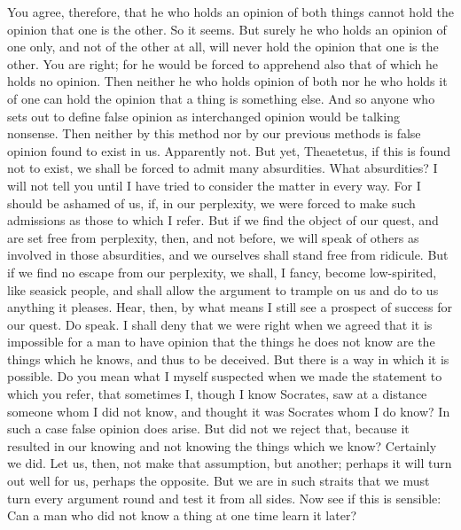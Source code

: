 \documentclass[letterpaper,12pt]{article}
\newcommand{\stephpag}[1]{\marginnote{\small\itshape\fontfamily{ppl}\selectfont #1}}
\begin{document}
\begin{drama}
\socratesspeaks
You agree, therefore, that he who holds an opinion of both things cannot hold the opinion that one is the other.
\theaetetusspeaks
So it seems.
\socratesspeaks
But surely he who holds an opinion of one only, and not of the other at all, will never hold the opinion that one is the other.
\theaetetusspeaks
You are right; for he would be forced to apprehend also that of which he holds no opinion.
\socratesspeaks
Then neither he who holds opinion of both nor he who holds it of one can hold the opinion that a thing is something else. \stephpag{e} And so anyone who sets out to define false opinion as interchanged opinion would be talking nonsense. Then neither by this method nor by our previous methods is false opinion found to exist in us.
\theaetetusspeaks
Apparently not.
\socratesspeaks
But yet, Theaetetus, if this is found not to exist, we shall be forced to admit many absurdities.
\theaetetusspeaks
What absurdities?
\socratesspeaks
I will not tell you until I have tried to consider the matter in every way. For I should be ashamed of us, if, in our perplexity, we were forced to make such admissions as those to which I refer. But if we find the object of our quest, \stephpag{191 a} and are set free from perplexity, then, and not before, we will speak of others as involved in those absurdities, and we ourselves shall stand free from ridicule. But if we find no escape from our perplexity, we shall, I fancy, become low-spirited, like seasick people, and shall allow the argument to trample on us and do to us anything it pleases. Hear, then, by what means I still see a prospect of success for our quest.
\theaetetusspeaks
Do speak.
\socratesspeaks
I shall deny that we were right when we agreed that it is impossible for a man to have opinion that the things he does not know are the things which he knows, \stephpag{b} and thus to be deceived. But there is a way in which it is possible.
\theaetetusspeaks
Do you mean what I myself suspected when we made the statement to which you refer, that sometimes I, though I know Socrates, saw at a distance someone whom I did not know, and thought it was Socrates whom I do know? In such a case false opinion does arise.
\socratesspeaks
But did not we reject that, because it resulted in our knowing and not knowing the things which we know?
\theaetetusspeaks
Certainly we did.
\socratesspeaks
Let us, then, not make that assumption, but another; perhaps \stephpag{c} it will turn out well for us, perhaps the opposite. But we are in such straits that we must turn every argument round and test it from all sides. Now see if this is sensible: Can a man who did not know a thing at one time learn it later?

\end{drama}
\end{document}
